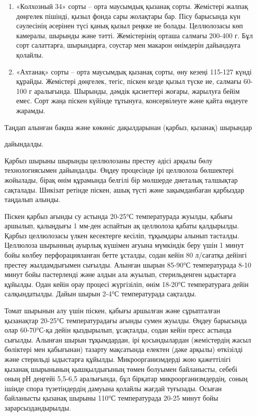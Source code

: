 \begin{enumerate}
\item
  «Колхозный 34» сорты -- орта маусымдық қызанақ сорты. Жемістері жалпақ
  дөңгелек пішінді, қызыл фонда сары жолақтары бар. Пісу барысында күн
  сәулесінің әсерінен түсі қанық қызыл реңкке ие болады. Целлюлозасы көп
  камералы, шырынды және тәтті. Жемістерінің орташа салмағы 200-400 г.
  Бұл сорт салаттарға, шырындарға, соустар мен макарон өнімдерін
  дайындауға қолайлы.
\item
  «Ахтанақ» сорты -- орта маусымдық қызанақ сорты, өну кезеңі 115-127
  күнді құрайды. Жемістері дөңгелек, тегіс, піскен кезде қызыл түске ие,
  салмағы 60-100 г аралығында. Шырынды, дәмдік қасиеттері жоғары,
  жарылуға бейім емес. Сорт жаңа піскен күйінде тұтынуға, консервілеуге
  және қайта өңдеуге жарамды.
\end{enumerate}

Таңдап алынған бақша және көкөніс дақылдарынан (қарбыз, қызанақ)
шырындар

дайындалды.

Қарбыз шырыны шырынды целлюлозаны престеу әдісі арқылы бөлу
технологиясымен дайындалды. Өңдеу процесінде ірі целлюлоза бөлшектері
жойылады, бірақ өнім құрамында белгілі бір мөлшерде диеталық талшықтар
сақталады. Шикізат ретінде піскен, ашық түсті және зақымданбаған
қарбыздар таңдалып алынды.

Піскен қарбыз ағынды су астында 20-25°С температурада жуылды, қабығы
аршылып, қалыңдығы 1 мм-ден аспайтын ақ целлюлоза қабаты қалдырылды.
Қарбыз целлюлозасы үлкен кесектерге кесіліп, тұқымдары алынып тасталды.
Целлюлоза шырынның ауырлық күшімен ағуына мүмкіндік беру үшін 1 минут
бойы көлбеу перфорацияланған бетте ұсталды, содан кейін 80 л/сағатқа
дейінгі престеу жылдамдығымен сығылды. Алынған шырын 85-90°С
температурада 8-10 минут бойы пастерленді және алдын ала жуылып,
стерильденген ыдыстарға құйылды. Одан кейін орау процесі жүргізіліп,
өнім 18-20°С температураға дейін салқындатылды. Дайын шырын 2-4°С
температурада сақталды.

Томат шырынын алу үшін піскен, қабығы аршылған және сұрыпталған
қызанақтар 20-25°С температурадағы ағынды сумен жуылды. Өңдеу барысында
олар 60-70°С-қа дейін қыздырылып, ұсақталды, содан кейін пресс астында
сығылды. Алынған шырын тұқымдардан, ірі қосындылардан (жемістердің жасыл
бөліктері мен қабығынан) тазарту мақсатында електен (дәке арқылы)
өткізілді және стерильді ыдыстарға құйылды. Микроорганизмдерді жою
қажеттілігі қызанақ шырынының қышқылдығының төмен болуымен байланысты,
себебі оның рН деңгейі 5,5-6,5 аралығында, бұл бірқатар
микроорганизмдердің, соның ішінде спора түзетіндердің дамуына қолайлы
жағдай туғызады. Осыған байланысты қызанақ шырыны 110°С температурада
20-25 минут бойы зарарсыздандырылды.

